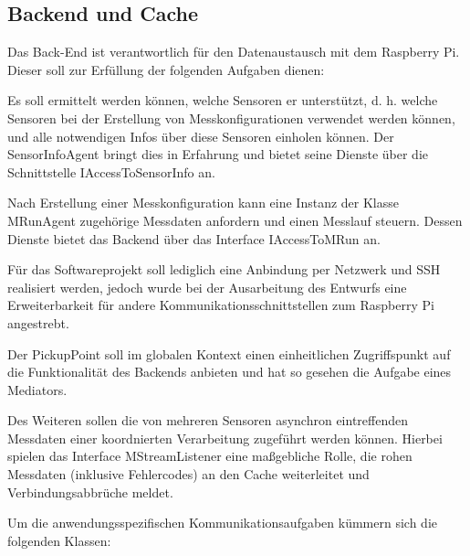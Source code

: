 \documentclass[parskip=full]{scrartcl}
\begin{document}
\subsection{Backend und Cache}

Das Back-End ist verantwortlich für den Datenaustausch mit dem Raspberry Pi. Dieser soll zur Erfüllung der folgenden Aufgaben dienen:

Es soll ermittelt werden können, welche Sensoren er unterstützt, d. h. welche Sensoren bei der Erstellung von Messkonfigurationen verwendet werden können, und alle notwendigen Infos über diese Sensoren einholen können. Der SensorInfoAgent bringt dies in Erfahrung und bietet seine Dienste über die Schnittstelle IAccessToSensorInfo an.

Nach Erstellung einer Messkonfiguration kann eine Instanz der Klasse MRunAgent zugehörige Messdaten anfordern und einen Messlauf steuern. Dessen Dienste bietet das Backend über das Interface IAccessToMRun an.

Für das Softwareprojekt soll lediglich eine Anbindung per Netzwerk und SSH realisiert werden, jedoch wurde bei der Ausarbeitung des Entwurfs eine Erweiterbarkeit für andere Kommunikationsschnittstellen zum Raspberry Pi angestrebt. 

Der PickupPoint soll im globalen Kontext einen einheitlichen Zugriffspunkt auf die Funktionalität des Backends anbieten und hat so gesehen die Aufgabe eines Mediators.

Des Weiteren sollen die von mehreren Sensoren asynchron eintreffenden Messdaten einer koordnierten Verarbeitung zugeführt werden können. Hierbei spielen das Interface MStreamListener eine maßgebliche Rolle, die rohen Messdaten (inklusive Fehlercodes) an den Cache weiterleitet und Verbindungsabbrüche meldet. 

Um die anwendungsspezifischen Kommunikationsaufgaben kümmern sich die folgenden Klassen:
\end{document}
